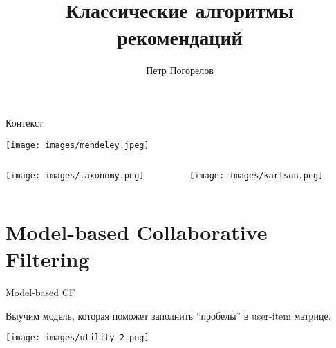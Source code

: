 \documentclass[11pt,aspectratio=169,handout]{beamer}
\author{Петр Погорелов}
\title{Классические алгоритмы рекомендаций}
\begin{document}
{

\begin{frame}
\titlepage
\end{frame}


}

\begin{frame}{Контекст}

\begin{center}
\texttt{[image: images/mendeley.jpeg]}
\end{center}

\end{frame}

\begin{frame}

\begin{columns}

\begin{column}{0.47\textwidth} 

\begin{center}
\texttt{[image: images/taxonomy.png]}
\end{center}

\end{column}

\begin{column}{0.47\textwidth} 

\begin{center}
\texttt{[image: images/karlson.png]}
\end{center}

\end{column}

\end{columns}

\end{frame}

\section{Model-based Collaborative Filtering}

\begin{frame}{Model-based CF}

\begin{tcolorbox}[colback=info!5,colframe=info!80,title=Идея]
Выучим модель, которая поможет заполнить ``пробелы'' в user-item матрице.
\end{tcolorbox}

\begin{center}
\texttt{[image: images/utility-2.png]}
\end{center}

\end{frame}
\end{document}
